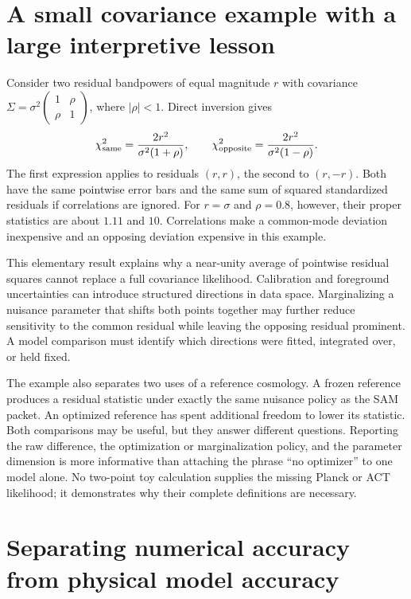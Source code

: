 \section{A small covariance example with a large interpretive lesson}

Consider two residual bandpowers of equal magnitude $r$ with covariance $\Sigma=\sigma^2\left(\begin{smallmatrix}1&\rho\\\rho&1\end{smallmatrix}\right)$, where $|\rho|<1$. Direct inversion gives
\begin{equation}
 \chi^2_{\rm same}=\frac{2r^2}{\sigma^2(1+\rho)},\qquad
 \chi^2_{\rm opposite}=\frac{2r^2}{\sigma^2(1-\rho)}.
 \label{c9:covexample}
\end{equation}
The first expression applies to residuals $(r,r)$, the second to $(r,-r)$. Both have the same pointwise error bars and the same sum of squared standardized residuals if correlations are ignored. For $r=\sigma$ and $\rho=0.8$, however, their proper statistics are about $1.11$ and $10$. Correlations make a common-mode deviation inexpensive and an opposing deviation expensive in this example.

This elementary result explains why a near-unity average of pointwise residual squares cannot replace a full covariance likelihood. Calibration and foreground uncertainties can introduce structured directions in data space. Marginalizing a nuisance parameter that shifts both points together may further reduce sensitivity to the common residual while leaving the opposing residual prominent. A model comparison must identify which directions were fitted, integrated over, or held fixed.

The example also separates two uses of a reference cosmology. A frozen reference produces a residual statistic under exactly the same nuisance policy as the SAM packet. An optimized reference has spent additional freedom to lower its statistic. Both comparisons may be useful, but they answer different questions. Reporting the raw difference, the optimization or marginalization policy, and the parameter dimension is more informative than attaching the phrase ``no optimizer'' to one model alone. No two-point toy calculation supplies the missing Planck or ACT likelihood; it demonstrates why their complete definitions are necessary.

\section{Separating numerical accuracy from physical model accuracy}

